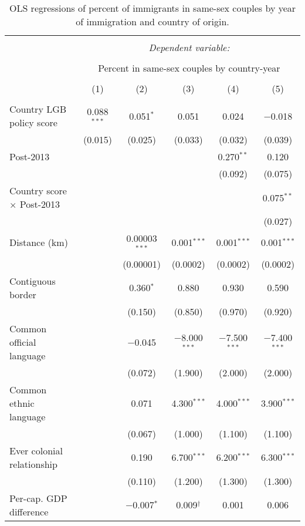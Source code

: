 \documentclass[
  11pt,
]{article}
\begin{document}
\begin{table}[H] \centering 
  \caption{OLS regressions of percent of immigrants in same-sex couples by year of immigration and country of origin.} 
  \label{tab:country-props-full} 
\begin{tabular}{@{\extracolsep{5pt}}lccccc} 
\\[-1.8ex]\hline 
\hline \\[-1.8ex] 
 & \multicolumn{5}{c}{\textit{Dependent variable:}} \\ 
\cline{2-6} 
\\[-1.8ex] & \multicolumn{5}{c}{Percent in same-sex couples by country-year} \\ 
\\[-1.8ex] & (1) & (2) & (3) & (4) & (5)\\ 
\hline \\[-1.8ex] 
 Country LGB policy score & 0.088$^{***}$ & 0.051$^{*}$ & 0.051 & 0.024 & $-$0.018 \\ 
  & (0.015) & (0.025) & (0.033) & (0.032) & (0.039) \\ 
  Post-2013 &  &  &  & 0.270$^{**}$ & 0.120 \\ 
  &  &  &  & (0.092) & (0.075) \\ 
  Country score × Post-2013 &  &  &  &  & 0.075$^{**}$ \\ 
  &  &  &  &  & (0.027) \\ 
  Distance (km) &  & 0.00003$^{***}$ & 0.001$^{***}$ & 0.001$^{***}$ & 0.001$^{***}$ \\ 
  &  & (0.00001) & (0.0002) & (0.0002) & (0.0002) \\ 
  Contiguous border &  & 0.360$^{*}$ & 0.880 & 0.930 & 0.590 \\ 
  &  & (0.150) & (0.850) & (0.970) & (0.920) \\ 
  Common official language &  & $-$0.045 & $-$8.000$^{***}$ & $-$7.500$^{***}$ & $-$7.400$^{***}$ \\ 
  &  & (0.072) & (1.900) & (2.000) & (2.000) \\ 
  Common ethnic language &  & 0.071 & 4.300$^{***}$ & 4.000$^{***}$ & 3.900$^{***}$ \\ 
  &  & (0.067) & (1.000) & (1.100) & (1.100) \\ 
  Ever colonial relationship &  & 0.190 & 6.700$^{***}$ & 6.200$^{***}$ & 6.300$^{***}$ \\ 
  &  & (0.110) & (1.200) & (1.300) & (1.300) \\ 
  Per-cap. GDP difference &  & $-$0.007$^{*}$ & 0.009$^{†}$ & 0.001 & 0.006 \\ 

\end{tabular}
\end{table}
\end{document}
